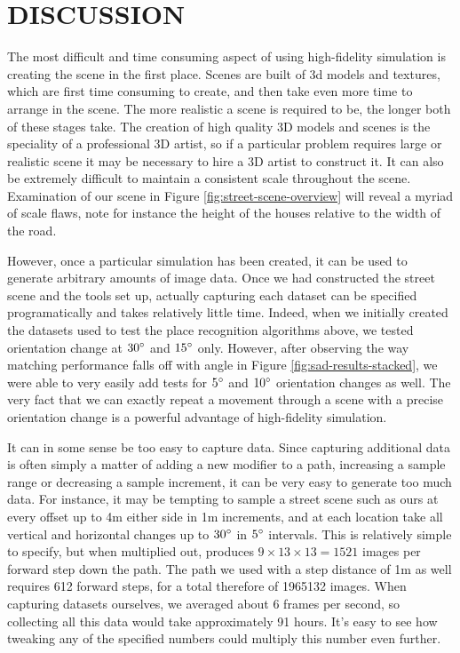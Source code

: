 \documentclass[letterpaper, 10 pt, conference]{ieeeconf}  %
\begin{document}
\section{DISCUSSION}

The most difficult and time consuming aspect of using high-fidelity simulation is creating the scene in the first place. Scenes are built of 3d models and textures, which are first time consuming to create, and then take even more time to arrange in the scene. The more realistic a scene is required to be, the longer both of these stages take. The creation of high quality 3D models and scenes is the speciality of a professional 3D artist, so if a particular problem requires large or realistic scene it may be necessary to hire a 3D artist to construct it. It can also be extremely difficult to maintain a consistent scale throughout the scene. Examination of our scene in Figure \ref{fig:street-scene-overview} will reveal a myriad of scale flaws, note for instance the height of the houses relative to the width of the road.

However, once a particular simulation has been created, it can be used to generate arbitrary amounts of image data. Once we had constructed the street scene and the tools set up, actually capturing each dataset can be specified programatically and takes relatively little time. Indeed, when we initially created the  datasets used to test the place recognition algorithms above, we tested orientation change at $30\degree$ and $15\degree$ only. However, after observing the way matching performance falls off with angle in Figure \ref{fig:sad-results-stacked}, we were able to very easily add tests for $5\degree$ and $10\degree$ orientation changes as well. The very fact that we can exactly repeat a movement through a scene with a precise orientation change is a powerful advantage of high-fidelity simulation.

It can in some sense be too easy to capture data. Since capturing additional data is often simply a matter of adding a new modifier to a path, increasing a sample range or decreasing a sample increment, it can be very easy to generate too much data. For instance, it may be tempting to sample a street scene such as ours at every offset up to 4m either side in 1m increments, and at each location take all vertical and horizontal changes up to $30\degree$ in $5\degree$ intervals. This is relatively simple to specify, but when multiplied out, produces $9 \times 13 \times 13 = 1521$ images per forward step down the path. The path we used with a step distance of 1m as well requires 612 forward steps, for a total therefore of 1965132 images. When capturing datasets ourselves, we averaged about 6 frames per second, so collecting all this data would take approximately 91 hours. It's easy to see how tweaking any of the specified numbers could multiply this number even further.
\end{document}
